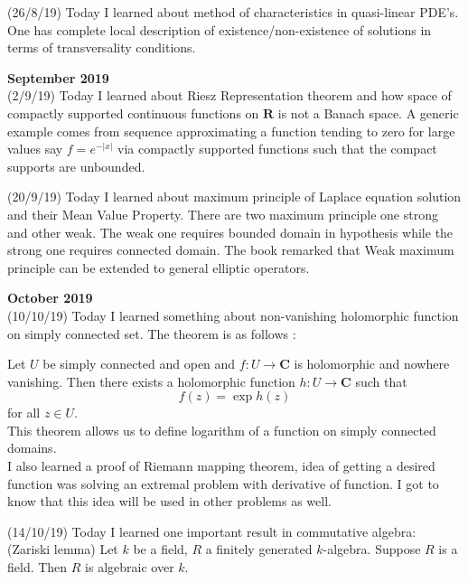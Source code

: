 \documentclass[12pt,a4paper]{article}
\begin{document}
(26/8/19) Today I learned about method of characteristics in quasi-linear PDE's. One has complete local description of existence/non-existence of  solutions in terms of transversality conditions. 
\\


\maketitle\textbf{September 2019} 
\\


(2/9/19) Today I learned about Riesz Representation theorem and how space of compactly supported continuous functions on $\mathbf{R}$ is not a Banach space. A generic example comes from sequence approximating a function tending to zero for large values say $f=e^{-|x|}$ via compactly supported functions such that the compact supports are unbounded.

(20/9/19) Today I learned about maximum principle of Laplace equation solution and their Mean Value Property. There are two maximum principle one strong and other weak. The weak one requires bounded domain in hypothesis while the strong one requires connected domain. The book remarked that Weak maximum principle can be extended to general elliptic operators.
\\


\maketitle\textbf{October 2019}
\\


(10/10/19) Today I learned something about non-vanishing holomorphic function on simply connected set. The theorem is as follows :

Let $U$ be simply connected and open and $f : U \rightarrow \mathbf{C}$ is holomorphic and nowhere vanishing. Then there exists a holomorphic function $h: U \rightarrow \mathbf{C}$ such that $$f(z)=\exp{h(z)}$$
for all $z\in U$.\\

This theorem allows us to define logarithm of a function on simply connected domains.\\
I also learned a proof of Riemann mapping theorem, idea of getting a desired function was solving an extremal problem with derivative of function. I got to know that this idea will be used in other problems as well.

(14/10/19) Today I learned one important result in commutative algebra:\\
(Zariski lemma) Let $k$ be a field, $R$ a finitely generated $k$-algebra. Suppose $R$ is a field. Then $R$ is algebraic over $k$.
\end{document}
